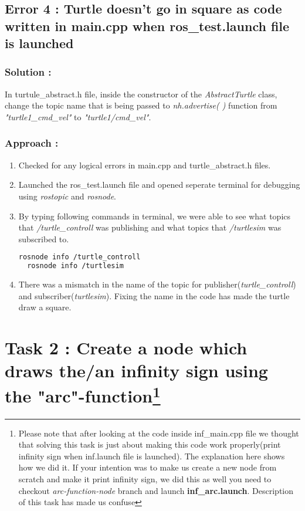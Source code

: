 \documentclass[12pt]{article}
\begin{document}

\subsection{Error 4 : Turtle doesn't go in square as code written in main.cpp when ros\_test.launch file is launched}

\subsubsection{Solution : }
In turtule\_abstract.h file, inside the constructor of the \textit{AbstractTurtle} class, change the topic name that is being passed to \textit{nh.advertise(   )} function from \textit{"turtle1\_cmd\_vel"} to \textit{"turtle1/cmd\_vel"}.

\subsubsection{Approach :}
\begin{enumerate}
\item Checked for any logical errors in main.cpp and turtle\_abstract.h files.
\item Launched the ros\_test.launch file and opened seperate terminal for debugging using \textit{rostopic} and \textit{rosnode}.
\item By typing following commands in terminal, we were able to see what topics that \textit{/turtle\_controll} was publishing and what topics that \textit{/turtlesim} was subscribed to.
\begin{lstlisting}[language=bash]
  rosnode info /turtle_controll
  rosnode info /turtlesim
\end{lstlisting}
\item There was a mismatch in the name of the topic for publisher(\textit{turtle\_controll}) and subscriber(\textit{turtlesim}). Fixing the name in the code has made the turtle draw a square.
\end{enumerate}

\newpage


\section{Task 2 : Create a node which draws the/an infinity sign using the "arc"-function\footnote{Please note that after looking at the code inside inf\_main.cpp file we thought that solving this task is just about making this code work properly(print infinity sign when inf.launch file is launched). The explanation here shows how we did it. If your intention was to make us create a new node from scratch and make it print infinity sign, we did this as well you need to checkout \textit{arc-function-node} branch and launch \textbf{inf\_arc.launch}. Description of this task has made us confuse}}
\end{document}
